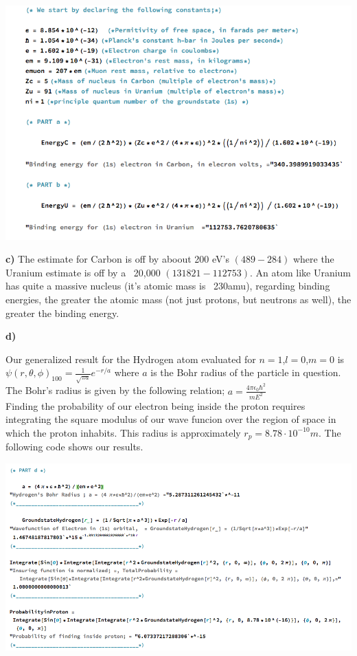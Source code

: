 \documentclass[10pt]{article}
\begin{document}
\begin{center}
    \includegraphics[width=0.9\linewidth]{parts_a_b.png}
\end{center}

\textbf{c)} The estimate for Carbon is off by aboout 200 eV's $(489-284)$ where the Uranium estimate is off by a ~20,000 $(131821-112753)$. An atom like Uranium has quite a massive nucleus (it's atomic mass is ~230amu),  regarding binding energies, the greater the atomic mass (not just protons, but neutrons as well), the greater the binding energy.

\textbf{d)}


Our generalized result for the Hydrogen atom evaluated for $n=1$,$l=0$,$m=0$ is $\psi(r,\theta,\phi)_{100}=\frac{1}{\sqrt{\pi a}}e^{-r/a}$ where $a$ is the Bohr radius of the particle in question. The Bohr's radius is given by the following relation; $a=\frac{4\pi\epsilon_0\hbar^2}{m E^2}$\\

Finding the probability of our electron being inside the proton requires integrating the square modulus of our wave funcion over the region of space in which the proton inhabits. This radius is approximately $r_p=8.78\cdot10^{-10}m$. The following code shows our results.\\
\begin{center}
    \includegraphics[width=0.9\linewidth]{partd2.png}
\end{center}
\end{document}
